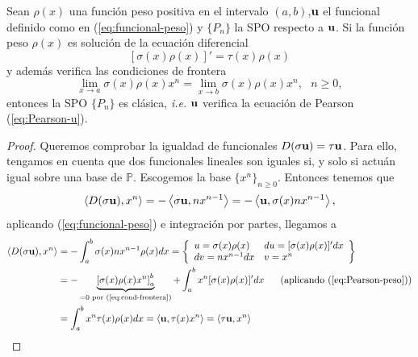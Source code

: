 \begin{lema}
    \label{lema:equivalencia-pearson}
    Sean $\rho(x)$ una función peso positiva en el intervalo $(a,b)$,$\mathbf{u}$ el funcional definido como en (\ref{eq:funcional-peso}) y $\{P_n\}$ la SPO respecto a $\mathbf{u}$. Si la función peso $\rho(x)$ es solución de la ecuación diferencial
    \begin{equation}
        \label{eq:Pearson-peso}
        [\sigma(x)\rho(x)]'=\tau(x)\rho(x)
    \end{equation}
    y además verifica las condiciones de frontera 
    \begin{equation}
        \label{eq:cond-frontera}
        \displaystyle\lim_{x\rightarrow a}\sigma(x)\rho(x)x^n = \displaystyle\lim_{x\rightarrow b}\sigma(x)\rho(x)x^n, \ \ \ n\geq 0,
    \end{equation}
    entonces la SPO $\{P_n\}$ es clásica, \textit{i.e.} $\mathbf{u}$ verifica la ecuación de Pearson (\ref{eq:Pearson-u}).
\end{lema}
\begin{proof}
    Queremos comprobar la igualdad de funcionales $D(\sigma \mathbf{u})=\tau\mathbf{u}$. Para ello, tengamos en cuenta que dos funcionales lineales son iguales si, y solo si actuán igual sobre una base de $\mathbb P$. Escogemos la base $\{x^n\}_{n\geq 0}$. Entonces tenemos que
    $$
    \left\langle D(\sigma \mathbf{u}) , x^n \right\rangle = -\left\langle \sigma \mathbf{u} , n x^{n-1} \right\rangle= -\left\langle \mathbf{u} , \sigma(x)n x^{n-1} \right\rangle,
    $$
    aplicando (\ref{eq:funcional-peso}) e integración por partes, llegamos a
    \begin{equation*}
        \begin{split}
            \prodesc{D(\sigma \uu)}{x^n} &= -\int_a^b \sigma(x)n x^{n-1}\rho(x)dx = \left\{\begin{array}{ll}
                u = \sigma(x)\rho(x) & du=[\sigma(x)\rho(x)]'dx \\
                dv = n x^{n-1}dx & v = x^n
            \end{array}\right\} \\
            &= -\underbrace{\left[\sigma(x)\rho(x)x^n\right]_a^b}_{=0\text{ por (\ref{eq:cond-frontera})}}+ \int_a^b x^n [\sigma(x)\rho(x)]'dx\ \ \ \ \  \text{(aplicando (\ref{eq:Pearson-peso}))} \\
            &= \int_a^b x^n \tau(x)\rho(x)dx = \prodesc{\uu}{\tau(x)x^n} = \prodesc{\tau \uu}{x^n}
        \end{split}
    \end{equation*}
    
\end{proof}

